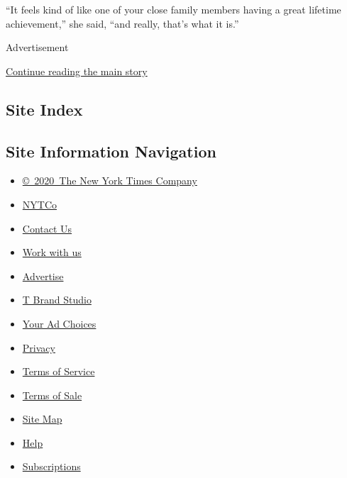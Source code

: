 ``It feels kind of like one of your close family members having a great
lifetime achievement,'' she said, ``and really, that's what it is.''

Advertisement

\protect\hyperlink{after-bottom}{Continue reading the main story}

\hypertarget{site-index}{%
\subsection{Site Index}\label{site-index}}

\hypertarget{site-information-navigation}{%
\subsection{Site Information
Navigation}\label{site-information-navigation}}

\begin{itemize}
\tightlist
\item
  \href{https://help.nytimes.com/hc/en-us/articles/115014792127-Copyright-notice}{©~2020~The
  New York Times Company}
\end{itemize}

\begin{itemize}
\tightlist
\item
  \href{https://www.nytco.com/}{NYTCo}
\item
  \href{https://help.nytimes.com/hc/en-us/articles/115015385887-Contact-Us}{Contact
  Us}
\item
  \href{https://www.nytco.com/careers/}{Work with us}
\item
  \href{https://nytmediakit.com/}{Advertise}
\item
  \href{http://www.tbrandstudio.com/}{T Brand Studio}
\item
  \href{https://www.nytimes.com/privacy/cookie-policy\#how-do-i-manage-trackers}{Your
  Ad Choices}
\item
  \href{https://www.nytimes.com/privacy}{Privacy}
\item
  \href{https://help.nytimes.com/hc/en-us/articles/115014893428-Terms-of-service}{Terms
  of Service}
\item
  \href{https://help.nytimes.com/hc/en-us/articles/115014893968-Terms-of-sale}{Terms
  of Sale}
\item
  \href{https://spiderbites.nytimes.com}{Site Map}
\item
  \href{https://help.nytimes.com/hc/en-us}{Help}
\item
  \href{https://www.nytimes.com/subscription?campaignId=37WXW}{Subscriptions}
\end{itemize}
